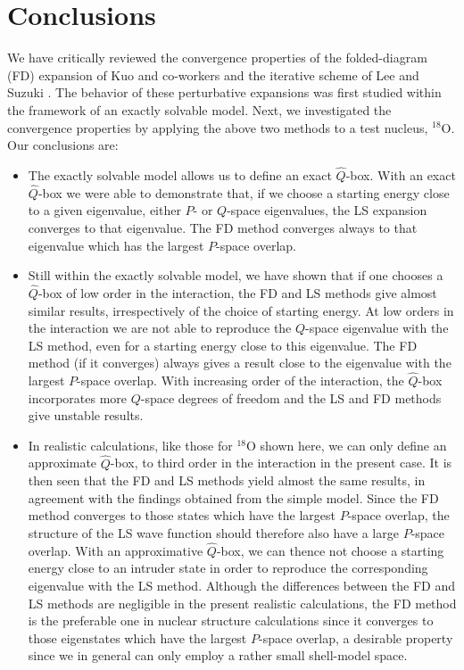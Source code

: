 \section{Conclusions}
We have critically reviewed the convergence properties 
of the folded-diagram
(FD) expansion of Kuo and co-workers \cite{ko90} and the iterative
scheme of Lee and Suzuki \cite{ls80}. The behavior of these perturbative
expansions was first studied within the framework of an exactly solvable
model. Next, we investigated the convergence properties by applying the
above two methods to a test nucleus, $^{18}$O. Our conclusions are:
\begin{itemize}
\item The exactly solvable model allows us to define an exact
$\hat{Q}$-box. With an exact $\hat{Q}$-box we were 
able to demonstrate that,
if we choose a starting energy close to a given eigenvalue, either
$P$- or $Q$-space eigenvalues, the LS expansion converges to that
eigenvalue.
The FD method
converges always to that eigenvalue which has the largest $P$-space
overlap.
\item Still within the exactly solvable model, we have shown that if one
chooses a $\hat{Q}$-box of low order in the interaction, the FD
and LS methods give almost similar results, irrespectively of
the choice of starting energy. 
At low orders in the interaction we are not able to reproduce the 
$Q$-space eigenvalue  with the LS method, even for a starting energy close to this
eigenvalue.
The FD method (if it converges) always gives a
result close to the  eigenvalue with the largest $P$-space
overlap. With increasing order of the interaction, the $\hat{Q}$-box
incorporates more $Q$-space degrees of freedom and the LS and FD methods
give unstable results. 
\item In realistic calculations, like those for $^{18}$O shown here,
we can only define an approximate $\hat{Q}$-box, to third
order in the interaction in the present case. It is then seen that the
FD and LS methods yield almost the same results, in agreement with the
findings obtained from the simple model. Since the FD method 
converges to those states which have the largest $P$-space overlap,
the structure of the LS wave function should therefore also have a large
$P$-space overlap. 
With an approximative $\hat{Q}$-box,
we can thence  not choose a starting energy close to an intruder state 
in order to reproduce the corresponding eigenvalue  with the LS method. 
Although the differences between the 
FD and LS methods
are negligible in the present
realistic calculations,
the FD
method is the preferable one 
in nuclear structure calculations since
it converges to those eigenstates which have the largest $P$-space
overlap, a desirable property since we in general can only employ a
rather small shell-model space.
\end{itemize}


